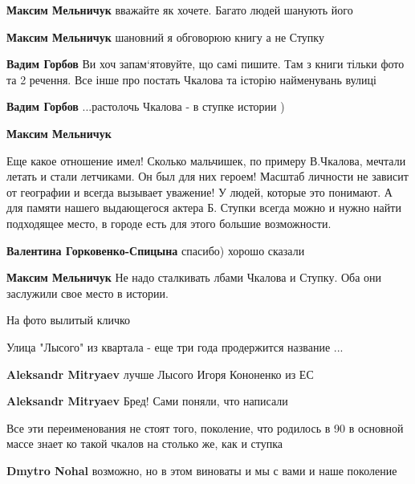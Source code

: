 \begin{itemize}
\begin{itemize}
\begin{itemize}
\textbf{Максим Мельничук} вважайте як хочете. Багато людей шанують його
\end{itemize} %

\textbf{Максим Мельничук} шановний я обговорюю книгу а не Ступку

\begin{itemize} %
\textbf{Вадим Горбов} Ви хоч запам‘ятовуйте, що самі пишите. Там з книги тільки фото та 2 речення. Все інше про постать Чкалова та історію найменувань вулиці

\textbf{Вадим Горбов} ...растолочь Чкалова - в ступке истории )
\end{itemize} %

\textbf{Максим Мельничук} 

Еще какое отношение имел! Сколько мальчишек, по примеру В.Чкалова, мечтали
летать и стали летчиками. Он был для них героем! Масштаб личности не зависит от
географии и всегда вызывает уважение! У людей, которые это понимают. А для
памяти нашего выдающегося актера Б. Ступки всегда можно и нужно найти
подходящее место, в городе есть для этого большие возможности.

\textbf{Валентина Горковенко-Спицына} спасибо) хорошо сказали

\textbf{Максим Мельничук} Не надо сталкивать лбами Чкалова и Ступку. Оба они заслужили свое место в истории.
\end{itemize} %

На фото вылитый кличко

Улица "Лысого" из квартала - еще три года продержится название ...

\begin{itemize} %
\textbf{Aleksandr Mitryaev} лучше Лысого Игоря Кононенко из ЕС

\textbf{Aleksandr Mitryaev} Бред! Сами поняли, что написали
\end{itemize} %


Все эти переименования не стоят того, поколение, что родилось в 90 в основной
массе знает ко такой чкалов на столько же, как и ступка

\begin{itemize} %
\textbf{Dmytro Nohal} возможно, но в этом виноваты и мы с вами и наше поколение


\end{itemize}
\end{itemize}
